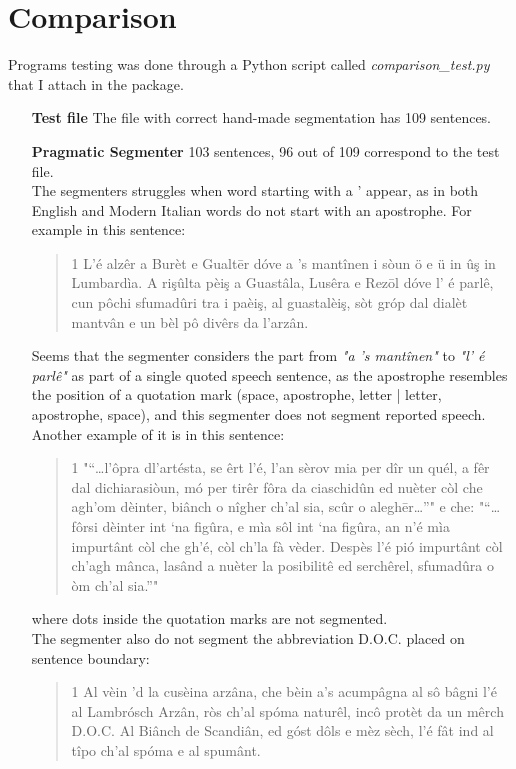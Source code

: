\documentclass{hitec}
\begin{document}
	\section{Comparison}
	Programs testing was done through a Python script called \textit{comparison\_test.py} that I attach in the package.
	\begin{itemize}
		\item [\textbf{Test file}] The file with correct hand-made segmentation has 109 sentences.
		\item [\textbf{Pragmatic Segmenter}] 103 sentences, 96 out of 109 correspond to the test file. \\ 
		The segmenters struggles when word starting with a ' appear, as in both English and Modern Italian words do not start with an apostrophe. For example in this sentence:
		\begin{quote}
			1 L'é alzêr a Burèt e Gualtēr dóve a 's mantînen i sòun ö e ü in ûş in Lumbardìa. A rişûlta pèiş a Guastâla, Lusêra e Rezōl dóve l' é parlê, cun pôchi sfumadûri tra i paèiş, al guastalèiş, sòt gróp dal dialèt mantvân e un bèl pô divêrs da l'arzân.
		\end{quote}
		Seems that the segmenter considers the part from \textit{"a 's mantînen"} to \textit{"l' é parlê"} as part of a single quoted speech sentence, as the apostrophe resembles the position of a quotation mark (space, apostrophe, letter | letter, apostrophe, space), and this segmenter does not segment reported speech. Another example of it is in this sentence:
		\begin{quote}
			1 "“…l’ôpra dl'artésta, se êrt l'é, l'an sèrov mia per dîr un quél, a fêr dal dichiarasiòun, mó per tirêr fôra da ciaschidûn ed nuèter còl che agh'om dèinter, biânch o nîgher ch'al sia, scûr o aleghēr…”" e che: "“…fôrsi dèinter int ‘na figûra, e mìa sôl int ‘na figûra, an n'é mìa impurtânt còl che gh'é, còl ch'la fà vèder. Despès l'é pió impurtânt còl ch'agh mânca, lasând a nuèter la posibilitê ed serchêrel, sfumadûra o òm ch'al sia.”"
		\end{quote}
		where dots inside the quotation marks are not segmented. \\
		The segmenter also do not segment the abbreviation D.O.C. placed on sentence boundary:
		\begin{quote}
			1 Al vèin 'd la cusèina arzâna, che bèin a's acumpâgna al sô bâgni l'é al Lambrósch Arzân, ròs ch'al spóma naturêl, incô protèt da un mêrch D.O.C. Al Biânch de Scandiân, ed góst dôls e mèz sèch, l'é fât ind al tîpo ch'al spóma e al spumânt.

\end{quote}
\end{itemize}
\end{document}
